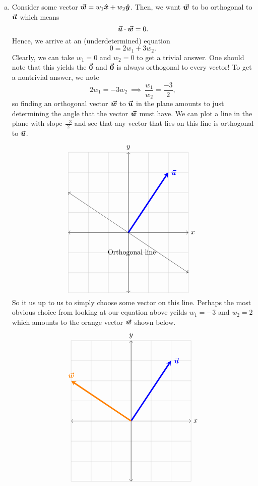 \documentclass[12pt]{article} %
\begin{document}
\begin{solution}
\begin{enumerate}[(a)]
        \item Consider some vector $\boldsymbol{\boldsymbol{\vec{w}}} = w_1 \boldsymbol{\hat{x}} + w_2 \boldsymbol{\hat{y}}$.  Then, we want $\boldsymbol{\boldsymbol{\vec{w}}}$ to bo orthogonal to $\boldsymbol{\boldsymbol{\vec{u}}}$ which means
        \[
            \boldsymbol{\boldsymbol{\vec{u}}} \cdot \boldsymbol{\boldsymbol{\vec{w}}} = 0.
        \]
        Hence, we arrive at an (underdetermined) equation
        \[
            0 = 2w_1+3w_2.
        \]
        Clearly, we can take $w_1=0$ and $w_2=0$ to get a trivial answer.  One should note that this yields the $\boldsymbol{\vec{0}}$ and $\boldsymbol{\vec{0}}$ is always orthogonal to every vector!  To get a nontrivial answer, we note
        \[
            2w_1 = -3w_2 ~\implies~ \frac{w_1}{w_2} = \frac{-3}{2},
        \]
        so finding an orthogonal vector $\boldsymbol{\boldsymbol{\vec{w}}}$ to $\boldsymbol{\boldsymbol{\vec{u}}}$ in the plane amounts to just determining the angle that the vector $\boldsymbol{\boldsymbol{\vec{w}}}$ must have.  We can plot a line in the plane with slope $\frac{-3}{2}$ and see that any vector that lies on this line is orthogonal to $\boldsymbol{\boldsymbol{\vec{u}}}$.
        \[
        \begin{tikzpicture}
        \draw[thin,gray!40] (-3,-3) grid (3,4);
        \draw[<->] (-3,0)--(3,0) node[right]{$x$};
        \draw[<->] (0,-3)--(0,4) node[above]{$y$};
        \draw[line width=2pt,blue,-stealth](0,0)--(2,3) node[anchor=west] at (2,3){$\vecu$};
        \draw[<->] (-3,2)--(3,-2) node[left] at (1.5,-1){Orthogonal line};
        \end{tikzpicture}
        \]
        So it us up to us to simply choose some vector on this line.  Perhaps the most obvious choice from looking at our equation above yeilds $w_1=-3$ and $w_2=2$ which amounts to the orange vector $\boldsymbol{\boldsymbol{\vec{w}}}$ shown below.
        \[
        \begin{tikzpicture}
        \draw[thin,gray!40] (-3,-3) grid (3,4);
        \draw[<->] (-3,0)--(3,0) node[right]{$x$};
        \draw[<->] (0,-3)--(0,4) node[above]{$y$};
        \draw[line width=2pt,blue,-stealth](0,0)--(2,3) node[anchor=west] at (2,3){$\vecu$};
        \draw[line width=2pt,orange,-stealth](0,0)--(-3,2) node[anchor=south] at (-3,2){$\vecw$};
        \end{tikzpicture}
        \]
    \end{enumerate} 
\end{solution}
\end{document}
